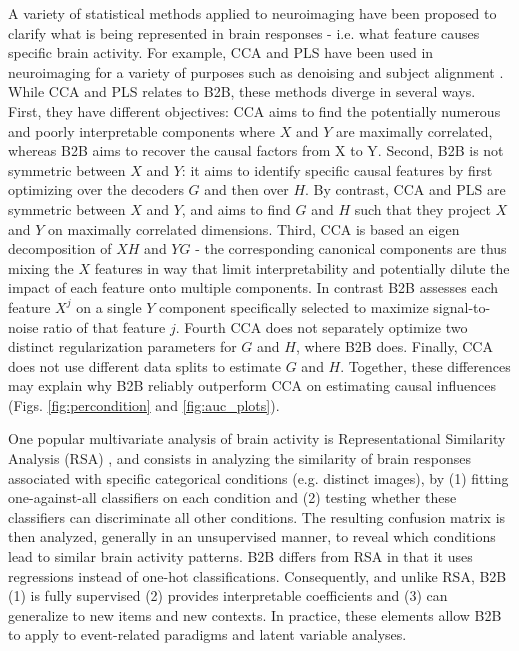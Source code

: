 \documentclass[preprint,12pt,3p]{elsarticle}
\begin{document}
A variety of statistical methods applied to neuroimaging have been
proposed to clarify what is being represented in brain responses - i.e. what
feature causes specific brain activity. For example, CCA and PLS have been used in
neuroimaging for a variety of purposes such as
denoising and subject alignment \citep{cca_hotelling, de2019multiway}. While CCA
and PLS relates to B2B, these methods diverge in several ways. First, they have different objectives: CCA aims to find the potentially numerous and poorly
interpretable components where $X$ and $Y$ are maximally correlated, whereas B2B
aims to recover the causal factors from X to Y. Second, B2B is not symmetric
between $X$ and $Y$: it aims to identify specific causal features by first
optimizing over the decoders $G$ and then over $H$. By contrast, CCA and PLS are
symmetric between $X$ and $Y$, and aims to find $G$ and $H$ such that they
project $X$ and $Y$ on maximally correlated dimensions. Third, CCA is based an
eigen decomposition of $XH$ and $YG$ - the corresponding canonical components
are thus mixing the $X$ features in way that limit interpretability and
potentially dilute the impact of each feature onto multiple components. In
contrast B2B assesses each feature $X^j$ on a single $Y$ component specifically
selected to maximize signal-to-noise ratio of that feature $j$. Fourth CCA does
not separately optimize two distinct regularization
parameters for $G$ and $H$, where B2B does. Finally, CCA does not use different data splits to
estimate $G$ and $H$. Together, these differences may explain why B2B reliably
outperform CCA on estimating causal influences (Figs. \ref{fig:percondition} and
\ref{fig:auc_plots}).

One popular multivariate analysis of brain activity is
Representational Similarity Analysis (RSA)
\citep{kriegeskorte2008representational}, and consists in analyzing the
similarity of brain responses associated with specific categorical conditions
(e.g. distinct images), by (1) fitting one-against-all classifiers on each
condition and (2) testing whether these classifiers can discriminate all other
conditions. The resulting confusion matrix is then analyzed, generally in an unsupervised
manner, to reveal which conditions lead to similar brain activity patterns. B2B
differs from RSA in that it uses regressions instead of one-hot classifications.
Consequently, and unlike RSA, B2B (1) is fully supervised (2) provides
interpretable coefficients and (3) can generalize to new items and new contexts.
In practice, these elements allow B2B to apply to event-related paradigms and
latent variable analyses.
\end{document}
